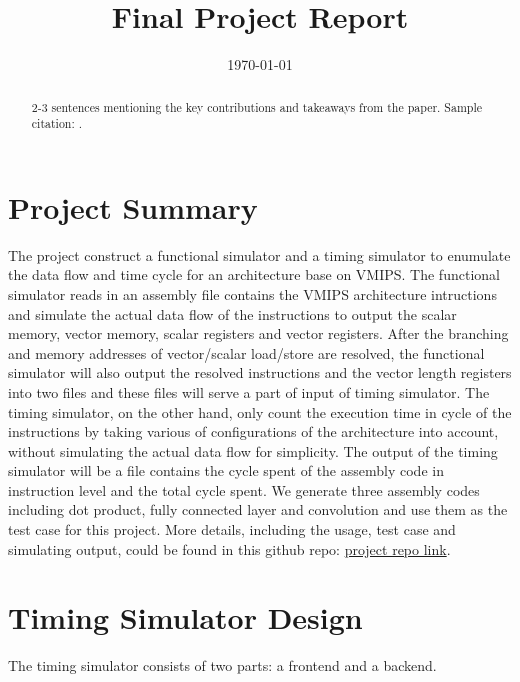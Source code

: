 \documentclass[conference]{IEEEtran}
\begin{document}
\title{Final Project Report}
\author{}
\date{\today}
\maketitle

\begin{abstract}
2-3 sentences mentioning the key contributions and takeaways from the paper. Sample citation: \cite{keshav2007read}.
\end{abstract}

\section{Project Summary}
The project construct a functional simulator and a timing simulator to enumulate the data flow and time cycle for an architecture base on VMIPS. The functional simulator reads in an assembly file contains the VMIPS architecture intructions and simulate the actual data flow of the instructions to output the scalar memory, vector memory, scalar registers and vector registers. After the branching and memory addresses of vector/scalar load/store are resolved, the functional simulator will also output the resolved instructions and the vector length registers into two files and these files will serve a part of input of timing simulator. The timing simulator, on the other hand, only count the execution time in cycle of the instructions by taking various of configurations of the architecture into account, without simulating the actual data flow for simplicity. The output of the timing simulator will be a file contains the cycle spent of the assembly code in instruction level and the total cycle spent. We generate three assembly codes including dot product, fully connected layer and convolution and use them as the test case for this project. More details, including the usage, test case and simulating output, could be found in this github repo: \href{https://github.com/Xinrt/VMIPS_project}{project repo link}.

\section{Timing Simulator Design}

The timing simulator consists of two parts: a frontend and a backend. 
\end{document}
